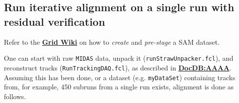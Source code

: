 \documentclass[12pt]{article}
\begin{document}
\subsection{Run iterative alignment on a single run with residual verification}\label{sub:run_iterative}
Refer to the \textbf{\href{https://redmine.fnal.gov/redmine/projects/g-2/wiki/Job_Running_Submission_FAQ}{Grid Wiki}} on how to \textit{create} and \textit{pre-stage} a SAM dataset. 

One can start with raw \texttt{MIDAS} data, unpack it (\verb!runStrawUnpacker.fcl!), and reconstruct tracks (\verb!RunTrackingDAQ.fcl!), as described in \textbf{\href{https://gm2-docdb.fnal.gov/cgi-bin/private/ShowDocument?docid=AAAA}{DocDB:AAAA}}. Assuming this has been done, or a dataset (e.g. \texttt{myDataSet}) containing tracks from, for example, 450 subruns from a single run exists, alignment is done as follows.
\end{document}
